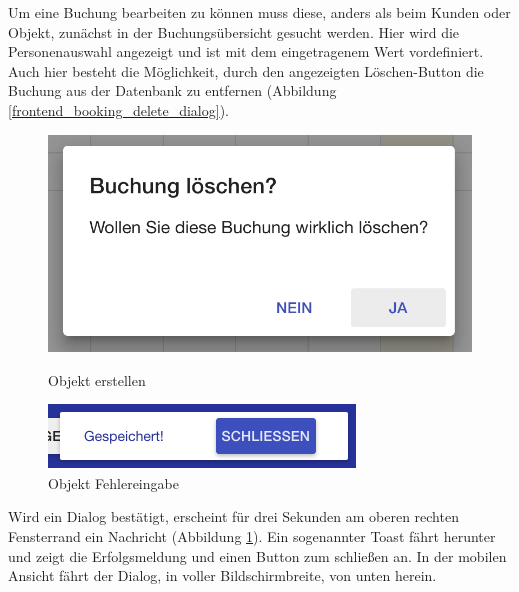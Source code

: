 Um eine Buchung bearbeiten zu können muss diese, anders als beim Kunden oder Objekt, zunächst in der Buchungsübersicht gesucht werden.
Hier wird die Personenauswahl angezeigt und ist mit dem eingetragenem Wert vordefiniert. Auch hier besteht die Möglichkeit, durch den
angezeigten Löschen-Button die Buchung aus der Datenbank zu entfernen (Abbildung \ref{frontend_booking_delete_dialog}).

\begin{figure}[H]
    \centering
    \begin{minipage}[t]{0.49\linewidth}
        \centering
        \includegraphics[width=\linewidth]{images/frontend_booking_delete_dialog.png}
        \caption{Objekt erstellen}
        \label{frontend_booking_delete_dialog}
    \end{minipage}%
    \hfill
    \begin{minipage}[t]{0.49\linewidth}
        \centering
        \includegraphics[width=\linewidth]{images/frontend_toast.png}
        \caption{Objekt Fehlereingabe}
         \label{frontend_toast}
    \end{minipage}
\end{figure}



Wird ein Dialog bestätigt, erscheint für drei Sekunden am oberen rechten Fensterrand ein Nachricht (Abbildung \ref{frontend_toast}).
Ein sogenannter Toast fährt herunter und zeigt die Erfolgsmeldung und einen Button zum schließen an. In der mobilen Ansicht fährt der Dialog,
in voller Bildschirmbreite, von unten herein.

